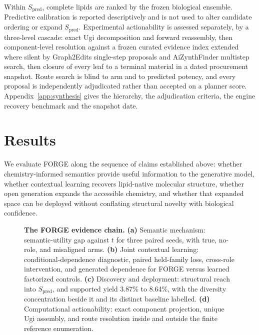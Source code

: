 \documentclass{article}
\newcommand{\FIGBOX}[1]{%
  \fbox{\begin{minipage}[c][#1][c]{\dimexpr\textwidth-2\fboxsep-2\fboxrule\relax}%
  \centering\textbf{[FIGURE IN PROGRESS]}%
  \end{minipage}}}
\newcommand{\SemSeeds}{three}                 %
\newcommand{\YieldBroad}{3.87\%}
\newcommand{\YieldEnriched}{8.64\%}
\newcommand{\Spred}{\ensuremath{S_{\mathrm{pred}}}}
\begin{document}
Within \Spred{}, complete lipids are ranked by the frozen biological ensemble. Predictive calibration
is reported descriptively and is not used to alter candidate ordering or expand \Spred{}. Experimental
actionability is assessed separately, by a three-level cascade: exact Ugi decomposition and forward
reassembly, then component-level resolution against a frozen curated evidence index extended where
silent by Graph2Edits single-step proposals and AiZynthFinder multistep search, then closure of every
leaf to a terminal material in a dated procurement snapshot. Route search is blind to arm and to
predicted potency, and every proposal is independently adjudicated rather than accepted on a planner
score. Appendix~\ref{app:synthesis} gives the hierarchy, the adjudication criteria, the engine
recovery benchmark and the snapshot date.

\section{Results}


We evaluate FORGE along the sequence of claims established above: whether chemistry-informed semantics
provide useful information to the generative model, whether contextual learning recovers lipid-native
molecular structure, whether open generation expands the accessible chemistry, and whether that
expanded space can be deployed without conflating structural novelty with biological confidence.

\begin{figure}[t]
\centering
\FIGBOX{3.4in}
\caption{\textbf{The FORGE evidence chain.}
\textbf{(a)} Semantic mechanism: semantic-utility gap against $t$ for \SemSeeds{} paired seeds, with
true, no-role, and misaligned arms.
\textbf{(b)} Joint contextual learning: conditional-dependence diagnostic, paired held-family loss,
cross-role intervention, and generated dependence for FORGE versus learned factorized controls.
\textbf{(c)} Discovery and deployment: structural reach into \Spred{}, and supported yield
\YieldBroad{} to \YieldEnriched{}, with the diversity concentration beside it and its distinct
baseline labelled.
\textbf{(d)} Computational actionability: exact component projection, unique Ugi assembly, and route
resolution inside and outside the finite reference enumeration.
}
\label{fig:evidence}
\end{figure}
\end{document}
